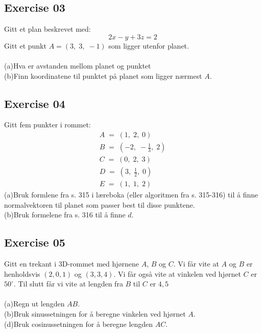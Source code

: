 \documentclass[12pt, a4paper]{article}
\begin{document}
\newpage\quad			
\subsection*{Exercise 03}
Gitt et plan beskrevet med:
	\begin{equation}
		\tag*{}
		2x-y+3z=2
	\end{equation}
Gitt et punkt $A=(3,\;3,\;-1)$ som ligger utenfor planet.\\\\
	(a)\quad Hva er avstanden mellom planet og punktet
			\begin{equation}
				\tag*{}
			\end{equation}
	(b)\quad Finn koordinatene til punktet på planet som
	ligger nærmest $A$.
			\begin{equation}
				\tag*{}			
			\end{equation}
			
\subsection*{Exercise 04}
Gitt fem punkter i rommet:
	\begin{gather}
		\tag*{}
			A\;=\;(1,\;2,\;0)\\
		\tag*{}
			B\;=\;\left(-2,\;-\frac{1}{3},\;2\right)\\
		\tag*{}
			C\;=\;(0,\;2,\;3)\\
		\tag*{}
			D\;=\;\left(3,\;\frac{1}{2},\;0\right)\\
		\tag*{}
			E\;=\;(1,\;1,\;2)
	\end{gather}
	(a)\quad Bruk formlene fra s. 315 i læreboka (eller
	algoritmen fra s. 315-316) til å finne normalvektoren til
	planet som passer best til disse punktene.
			\begin{equation}
				\tag*{}
			\end{equation}
	(b)\quad Bruk formelene fra s. 316 til å finne $d$.
			\begin{equation}
				\tag*{}
			\end{equation}
	
\subsection*{Exercise 05}
Gitt en trekant i 3D-rommet med hjørnene $A$, $B$ og $C$.
Vi får vite at $A$ og $B$ er henholdsvis $(2, 0, 1)$ og
$(3, 3, 4)$. Vi får også vite at vinkelen ved hjørnet $C$ er $50^\circ$. Til slutt får vi vite at lengden fra $B$ til $C$ er 
$4,5$\\\\
	(a)\quad Regn ut lengden $AB$.
			\begin{equation}
				\tag*{}
			\end{equation}
	(b)\quad Bruk sinussetningen for å beregne vinkelen
	ved hjørnet $A$.
			\begin{equation}
				\tag*{}
			\end{equation}
	(d)\quad Bruk cosinussetningen for å beregne lengden $AC$.
			\begin{equation}
				\tag*{}
			\end{equation}
\end{document}
